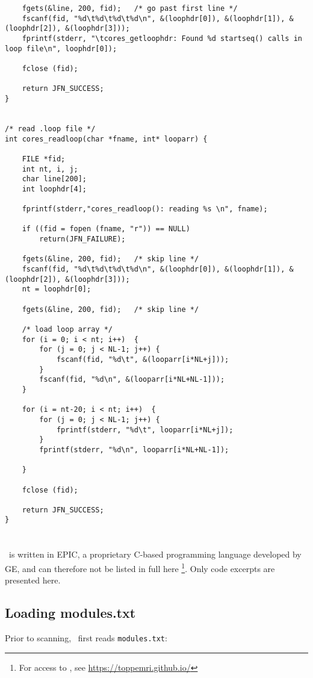 \begin{lstlisting}
	fgets(&line, 200, fid);   /* go past first line */
	fscanf(fid, "%d\t%d\t%d\t%d\n", &(loophdr[0]), &(loophdr[1]), &(loophdr[2]), &(loophdr[3])); 
	fprintf(stderr, "\tcores_getloophdr: Found %d startseq() calls in loop file\n", loophdr[0]);

	fclose (fid);

	return JFN_SUCCESS;
}


/* read .loop file */
int cores_readloop(char *fname, int* looparr) {

	FILE *fid;
	int nt, i, j;
	char line[200];
	int loophdr[4];

	fprintf(stderr,"cores_readloop(): reading %s \n", fname);

	if ((fid = fopen (fname, "r")) == NULL)
		return(JFN_FAILURE);

	fgets(&line, 200, fid);   /* skip line */
	fscanf(fid, "%d\t%d\t%d\t%d\n", &(loophdr[0]), &(loophdr[1]), &(loophdr[2]), &(loophdr[3])); 
	nt = loophdr[0];

	fgets(&line, 200, fid);   /* skip line */

	/* load loop array */
	for (i = 0; i < nt; i++)  {
		for (j = 0; j < NL-1; j++) {	
			fscanf(fid, "%d\t", &(looparr[i*NL+j]));
		}
		fscanf(fid, "%d\n", &(looparr[i*NL+NL-1]));
	}

	for (i = nt-20; i < nt; i++)  {
		for (j = 0; j < NL-1; j++) {	
			fprintf(stderr, "%d\t", looparr[i*NL+j]);
		}
		fprintf(stderr, "%d\n", looparr[i*NL+NL-1]);

	}

	fclose (fid);

	return JFN_SUCCESS;
}

\end{lstlisting}


\section{ \toppe }

\toppe~is written in EPIC, a proprietary C-based programming language developed by GE, and can therefore not be listed in full here \footnote{For access to \toppe, see \url{https://toppemri.github.io/}}.
Only code excerpts are presented here.


\subsection{Loading modules.txt}

Prior to scanning, \toppe~first reads {\tt modules.txt}:

